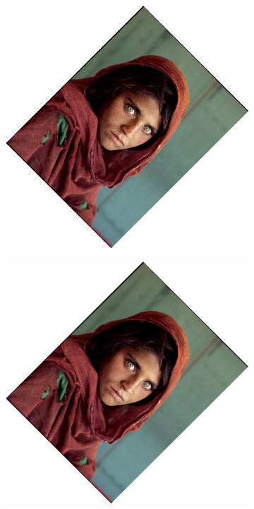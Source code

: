 \documentclass{article}
\begin{document}
\begin{figure}[H]
    \centering
    \begin{subfigure}{.3\textwidth}
        \centering
        \includegraphics[scale=0.04]{q1/output/similar_d:_4_s:_0.5.jpg}
    \end{subfigure}
    \begin{subfigure}{.3\textwidth}
        \centering
        \includegraphics[scale=0.04]{q1/output/similar_d:_4_s:_1.jpg}

\end{subfigure}
\end{figure}
\end{document}
